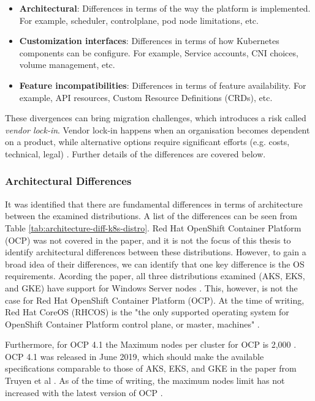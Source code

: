 \begin{itemize}

\item \textbf{Architectural}: Differences in terms of the way the platform is implemented. For example, scheduler, controlplane, pod node limitations, etc. 
\item \textbf{Customization interfaces}: Differences in terms of how Kubernetes components can be configure. For example, Service accounts, CNI choices, volume management, etc.
\item \textbf{Feature incompatibilities}: Differences in terms of feature availability. For example, API resources, Custom Resource Definitions (CRDs), etc.

\end{itemize}

These divergences can bring migration challenges, which introduces a risk called \textit{vendor lock-in}. Vendor lock-in happens when an organisation becomes dependent on a product, while alternative options require significant efforts (e.g. costs, technical, legal) \cite{opara2016critical}. Further details of the differences are covered below.


\subsubsection{Architectural Differences}

It was identified that there are fundamental differences in terms of architecture between the examined distributions. A list of the differences can be seen from Table \ref{tab:architecture-diff-k8s-distro}. Red Hat OpenShift Container Platform (OCP) was not covered in the paper, and it is not the focus of this thesis to identify architectural differences between these distributions. However, to gain a broad idea of their differences, we can identify that one key difference is the OS requirements. Acording the paper, all three distributions examined (AKS, EKS, and GKE) have support for Windows Server nodes \cite{truyen_managing_2020}. This, however, is not the case for Red Hat OpenShift Container Platform (OCP). At the time of writing, Red Hat CoreOS (RHCOS) is the "the only supported operating system for OpenShift Container Platform control plane, or master, machines" \cite{noauthor_red_nodate}.

Furthermore, for OCP 4.1 the Maximum nodes per cluster for OCP is 2,000 \cite{noauthor_chapter_nodate-2}. OCP 4.1 was released in June 2019, which should make the available specifications comparable to those of AKS, EKS, and GKE in the paper from Truyen et al \cite{truyen_managing_2020}. As of the time of writing, the maximum nodes limit has not increased with the latest version of OCP \cite{noauthor_chapter_nodate-1}.


